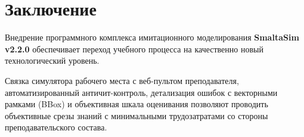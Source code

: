 \documentclass[12pt,a4paper]{report}
\begin{document}
\chapter*{Заключение}

Внедрение программного комплекса имитационного моделирования \textbf{SmaltaSim v2.2.0} обеспечивает переход учебного процесса на качественно новый технологический уровень. 

Связка симулятора рабочего места с веб-пультом преподавателя, автоматизированный античит-контроль, детализация ошибок с векторными рамками (BBox) и объективная шкала оценивания позволяют проводить объективные срезы знаний с минимальными трудозатратами со стороны преподавательского состава.
\end{document}
